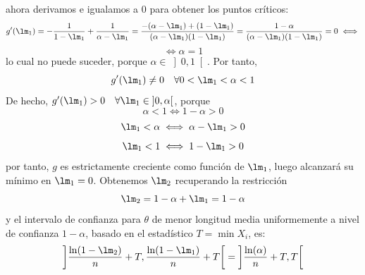 \documentclass[12pt]{article}
\begin{document}
\begin{ejercicio}
\begin{enumerate}[label=\alph*)]
            ahora derivamos e igualamos a $0$ para obtener los puntos críticos:
            $$g'(\lm_1) = - \dfrac{1}{1-\lm_1} + \dfrac{1}{\alpha - \lm_1} = \dfrac{-(\alpha - \lm_1) + (1 - \lm_1)}{(\alpha - \lm_1)(1 - \lm_1)} = \dfrac{1 - \alpha}{(\alpha - \lm_1)(1 - \lm_1)} = 0 \iff$$
            $$\iff \alpha = 1$$
            lo cual no puede suceder, porque $\alpha \in \left]0,1 \right[$. Por tanto, $$g'(\lm_1) \neq 0 \quad \forall 0 < \lm_1 < \alpha < 1$$
            De hecho, $g'(\lm_1) > 0 \quad \forall \lm_1 \in \left]0,\alpha \right[$, porque
            $$\alpha < 1 \iff 1 - \alpha > 0$$
            $$\lm_1 < \alpha \iff \alpha - \lm_1 > 0$$
            $$\lm_1 < 1 \iff 1 - \lm_1 > 0$$
            por tanto, $g$ es estrictamente creciente como función de $\lm_1$, luego alcanzará su mínimo en $\lm_1 = 0$. Obtenemos $\lm_2$ recuperando la restricción
            $$\lm_2 = 1 - \alpha + \lm_1 = 1 - \alpha$$
            y el intervalo de confianza para $\theta$ de menor longitud media uniformemente a nivel de confianza $1-\alpha$, basado en el estadístico $T = \min X_i$, es:
            \begin{equation*}
                \left] \dfrac{\ln(1-\lm_2)}{n} + T, \dfrac{\ln(1-\lm_1)}{n} + T \right[ = \left] \dfrac{\ln(\alpha)}{n} + T, T \right[
            \end{equation*}
        \end{enumerate}
    \end{ejercicio}

    \newpage
\end{document}
